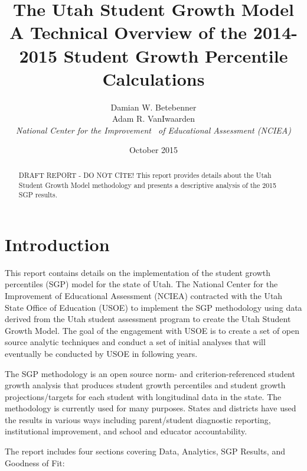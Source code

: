\documentclass[12pt]{article}
\begin{document}
\title{\textsf{\LARGE The Utah Student Growth Model  \\\medskip A Technical Overview of the 2014-2015 Student Growth Percentile
Calculations }}
\author{  Damian W. Betebenner    \\   Adam R. VanIwaarden    \\   \emph{National Center for the Improvement \ of Educational Assessment (NCIEA)}   }

 \date{October 2015} 

\maketitle

\newpage

\begin{abstract}
DRAFT REPORT - DO NOT CITE! This report provides details about the Utah
Student Growth Model methodology and presents a descriptive analysis of
the 2015 SGP results.
\end{abstract}
\newpage

\section{Introduction}\label{introduction}

This report contains details on the implementation of the student growth
percentiles (SGP) model for the state of Utah. The National Center for
the Improvement of Educational Assessment (NCIEA) contracted with the
Utah State Office of Education (USOE) to implement the SGP methodology
using data derived from the Utah student assessment program to create
the Utah Student Growth Model. The goal of the engagement with USOE is
to create a set of open source analytic techniques and conduct a set of
initial analyses that will eventually be conducted by USOE in following
years.

The SGP methodology is an open source norm- and criterion-referenced
student growth analysis that produces student growth percentiles and
student growth projections/targets for each student with longitudinal
data in the state. The methodology is currently used for many purposes.
States and districts have used the results in various ways including
parent/student diagnostic reporting, institutional improvement, and
school and educator accountability.

The report includes four sections covering Data, Analytics, SGP Results,
and Goodness of Fit:
\end{document}
